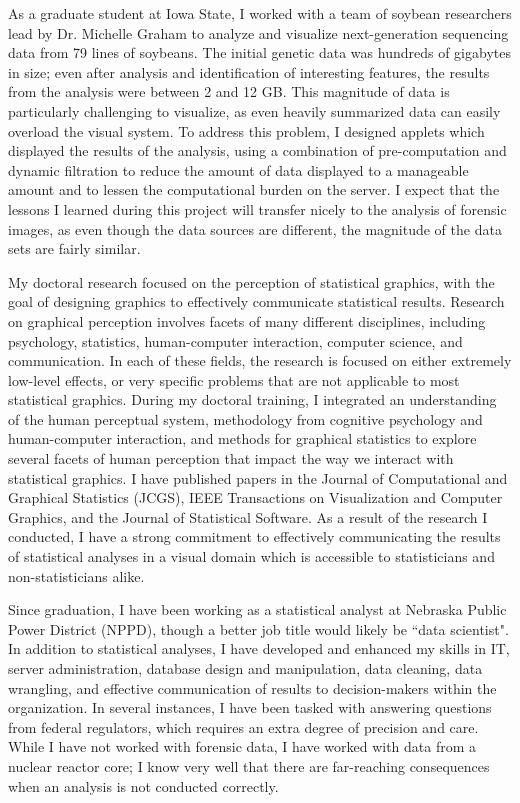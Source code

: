 \documentclass[12pt, letterpaper, sans]{moderncv}
\begin{document}
As a graduate student at Iowa State, I worked with a team of soybean researchers lead by Dr. Michelle Graham to analyze and visualize next-generation sequencing data from 79 lines of soybeans. The initial genetic data was hundreds of gigabytes in size; even after analysis and identification of interesting features, the results from the analysis were between 2 and 12 GB. This magnitude of data is particularly challenging to visualize, as even heavily summarized data can easily overload the visual system. To address this problem, I designed applets which displayed the results of the analysis, using a combination of pre-computation and dynamic filtration to reduce the amount of data displayed to a manageable amount and to lessen the computational burden on the server. I expect that the lessons I learned during this project will transfer nicely to the analysis of forensic images, as even though the data sources are different, the magnitude of the data sets are fairly similar. 

My doctoral research focused on the perception of statistical graphics, with the goal of designing graphics to effectively communicate statistical results. Research on graphical perception involves facets of many different disciplines, including psychology, statistics, human-computer interaction, computer science, and communication. In each of these fields, the research is focused on either extremely low-level effects, or very specific problems that are not applicable to most statistical graphics. During my doctoral training, I integrated an understanding of the human perceptual system, methodology from cognitive psychology and human-computer interaction, and methods for graphical statistics to explore several facets of human perception that impact the way we interact with statistical graphics. I have published papers in the Journal of Computational and Graphical Statistics (JCGS), IEEE Transactions on Visualization and Computer Graphics, and the Journal of Statistical Software. As a result of the research I conducted, I have a strong commitment to effectively communicating the results of statistical analyses in a visual domain which is accessible to statisticians and non-statisticians alike. 

Since graduation, I have been working as a statistical analyst at Nebraska Public Power District (NPPD), though a better job title would likely be ``data scientist". In addition to statistical analyses, I have developed and enhanced my skills in IT, server administration, database design and manipulation, data cleaning, data wrangling, and effective communication of results to decision-makers within the organization. In several instances, I have been tasked with answering questions from federal regulators, which requires an extra degree of precision and care. While I have not worked with forensic data, I have worked with data from a nuclear reactor core; I know very well that there are far-reaching consequences when an analysis is not conducted correctly. 
\end{document}
